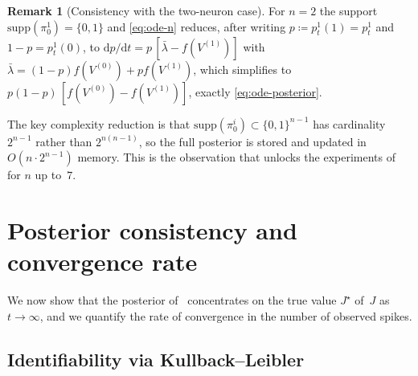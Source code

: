 \documentclass[11pt,a4paper]{article}
\theoremstyle{definition}
\newtheorem{remark}[theorem]{Remark}
\begin{document}
\begin{remark}[Consistency with the two-neuron case]
For $n = 2$ the support $\mathrm{supp}(\pi_0^1) = \{0, 1\}$ and
\eqref{eq:ode-n} reduces, after writing $p \coloneqq p_t^1(1) = p_t^1$
and $1 - p = p_t^1(0)$, to $\mathrm{d} p/\mathrm{d} t = p\,[\bar\lambda
- f(V^{(1)})]$ with $\bar\lambda = (1-p) f(V^{(0)}) + p f(V^{(1)})$,
which simplifies to $p(1-p)\,[f(V^{(0)}) - f(V^{(1)})]$, exactly
\eqref{eq:ode-posterior}.
\end{remark}

The key complexity reduction is that
$\mathrm{supp}(\pi_0^i) \subset \{0, 1\}^{n-1}$ has cardinality
$2^{n-1}$ rather than $2^{n(n-1)}$, so the full posterior is stored and
updated in $O(n \cdot 2^{n-1})$ memory. This is the observation that
unlocks the experiments of~ for $n$ up to~$7$.

\section{Posterior consistency and convergence rate}
\label{sec:consistency}

We now show that the posterior of~ concentrates on
the true value $J^\star$ of~$J$ as $t \to \infty$, and we quantify the
rate of convergence in the number of observed spikes.

\subsection{Identifiability via Kullback--Leibler}
\label{subsec:identifiability}
\end{document}
